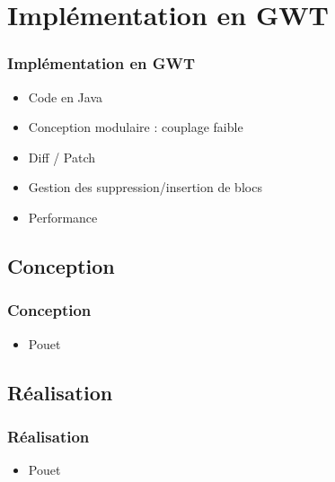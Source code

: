 \section{Implémentation en GWT}
  \begin{frame}
    \frametitle{Implémentation en GWT}
    \begin{itemize}
      \item Code en Java
      \item Conception modulaire : couplage faible
      \item Diff / Patch
      \item Gestion des suppression/insertion de blocs
      \item Performance
    \end{itemize}
  \end{frame}

  \subsection*{Conception}
    \begin{frame}
      \frametitle{Conception}
      \begin{itemize}
        \item Pouet
      \end{itemize}
    \end{frame}

  \subsection*{Réalisation}
    \begin{frame}
      \frametitle{Réalisation}
      \begin{itemize}
        \item Pouet
      \end{itemize}
    \end{frame}

